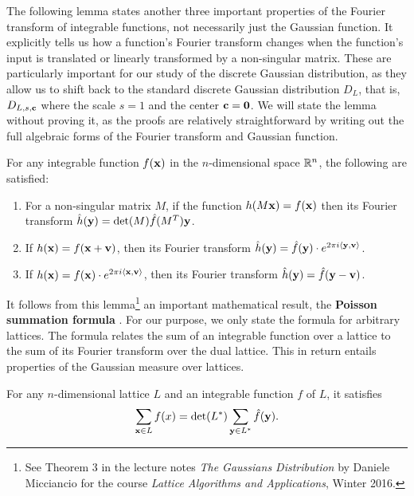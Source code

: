 \documentclass[../main.tex]{subfiles}
\begin{document}
The following lemma states another three important properties of the Fourier transform of integrable functions, not necessarily just the Gaussian function. It explicitly tells us how a function's Fourier transform changes when the function's input is translated or linearly transformed by a non-singular matrix. These are particularly important for our study of the discrete Gaussian distribution, as they allow us to shift back to the standard discrete Gaussian distribution $D_L$, that is, $D_{L,s,\mathbf{c}}$ where the scale $s=1$ and the center $\mathbf{c}=\mathbf{0}$. We will state the lemma without proving it, as the proofs are relatively straightforward by writing out the full algebraic forms of the Fourier transform and Gaussian function. 

\begin{lemma}
\label{lm:FTProperties}
For any integrable function $f(\mathbf{x})$ in the $n$-dimensional space $\mathbb{R}^n$, the following are satisfied:
\begin{enumerate}
    \item For a non-singular matrix $M$, if the function $h(M\mathbf{x})=f(\mathbf{x})$ then its Fourier transform $\hat{h}(\mathbf{y})=\det(M) \hat{f}(M^T) \mathbf{y}$.
    \item If $h(\mathbf{x})=f(\mathbf{x}+\mathbf{v})$, then its Fourier transform $\hat{h}(\mathbf{y})=\hat{f}(\mathbf{y}) \cdot e^{2\pi i \langle \mathbf{y},\mathbf{v}\rangle}$.
    \item If $h(\mathbf{x})=f(\mathbf{x})\cdot e^{2\pi i \langle \mathbf{x},\mathbf{v}\rangle}$, then its Fourier transform $\hat{h}(\mathbf{y})=\hat{f}(\mathbf{y}-\mathbf{v})$.
\end{enumerate}
\end{lemma}

It follows from this lemma\footnote{See Theorem 3 in the lecture notes \textit{The Gaussians Distribution} by Daniele Micciancio for the course \textit{Lattice Algorithms and Applications}, Winter 2016.} an important mathematical result, the \textbf{Poisson summation formula} . For our purpose, we only state the formula for arbitrary lattices. The formula relates the sum of an integrable function over a lattice to the sum of its Fourier transform over the dual lattice. This in return entails properties of the Gaussian measure over lattices.  
\begin{lemma}
\reversemarginpar
{}
For any $n$-dimensional lattice $L$ and an integrable function $f$ of $L$, it satisfies 
\begin{equation}
    \sum_{\mathbf{x} \in L} f(x) = \det(L^*) \sum_{\mathbf{y} \in L^*} \hat{f}(\mathbf{y}).
\end{equation}
\end{lemma}
\end{document}
